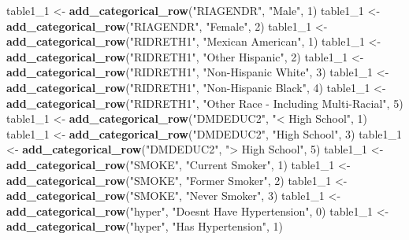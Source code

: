 \documentclass[
]{article}
\newenvironment{Shaded}{\begin{snugshade}}{\end{snugshade}}
\newcommand{\DecValTok}[1]{\textcolor[rgb]{0.00,0.00,0.81}{#1}}
\newcommand{\FunctionTok}[1]{\textcolor[rgb]{0.13,0.29,0.53}{\textbf{#1}}}
\newcommand{\NormalTok}[1]{#1}
\newcommand{\OtherTok}[1]{\textcolor[rgb]{0.56,0.35,0.01}{#1}}
\newcommand{\StringTok}[1]{\textcolor[rgb]{0.31,0.60,0.02}{#1}}
\begin{document}
\begin{Shaded}
\begin{Highlighting}[]
\NormalTok{table1\_1 }\OtherTok{\textless{}{-}} \FunctionTok{add\_categorical\_row}\NormalTok{(}\StringTok{"RIAGENDR"}\NormalTok{, }\StringTok{"Male"}\NormalTok{, }\DecValTok{1}\NormalTok{)}
\NormalTok{table1\_1 }\OtherTok{\textless{}{-}} \FunctionTok{add\_categorical\_row}\NormalTok{(}\StringTok{"RIAGENDR"}\NormalTok{, }\StringTok{"Female"}\NormalTok{, }\DecValTok{2}\NormalTok{)}
\NormalTok{table1\_1 }\OtherTok{\textless{}{-}} \FunctionTok{add\_categorical\_row}\NormalTok{(}\StringTok{"RIDRETH1"}\NormalTok{, }\StringTok{"Mexican American"}\NormalTok{, }\DecValTok{1}\NormalTok{)}
\NormalTok{table1\_1 }\OtherTok{\textless{}{-}} \FunctionTok{add\_categorical\_row}\NormalTok{(}\StringTok{"RIDRETH1"}\NormalTok{, }\StringTok{"Other Hispanic"}\NormalTok{, }\DecValTok{2}\NormalTok{)}
\NormalTok{table1\_1 }\OtherTok{\textless{}{-}} \FunctionTok{add\_categorical\_row}\NormalTok{(}\StringTok{"RIDRETH1"}\NormalTok{, }\StringTok{"Non{-}Hispanic White"}\NormalTok{, }\DecValTok{3}\NormalTok{)}
\NormalTok{table1\_1 }\OtherTok{\textless{}{-}} \FunctionTok{add\_categorical\_row}\NormalTok{(}\StringTok{"RIDRETH1"}\NormalTok{, }\StringTok{"Non{-}Hispanic Black"}\NormalTok{, }\DecValTok{4}\NormalTok{)}
\NormalTok{table1\_1 }\OtherTok{\textless{}{-}} \FunctionTok{add\_categorical\_row}\NormalTok{(}\StringTok{"RIDRETH1"}\NormalTok{, }\StringTok{"Other Race {-} Including Multi{-}Racial"}\NormalTok{, }\DecValTok{5}\NormalTok{)}
\NormalTok{table1\_1 }\OtherTok{\textless{}{-}} \FunctionTok{add\_categorical\_row}\NormalTok{(}\StringTok{"DMDEDUC2"}\NormalTok{, }\StringTok{"\textless{} High School"}\NormalTok{, }\DecValTok{1}\NormalTok{)}
\NormalTok{table1\_1 }\OtherTok{\textless{}{-}} \FunctionTok{add\_categorical\_row}\NormalTok{(}\StringTok{"DMDEDUC2"}\NormalTok{, }\StringTok{"High School"}\NormalTok{, }\DecValTok{3}\NormalTok{)}
\NormalTok{table1\_1 }\OtherTok{\textless{}{-}} \FunctionTok{add\_categorical\_row}\NormalTok{(}\StringTok{"DMDEDUC2"}\NormalTok{, }\StringTok{"\textgreater{} High School"}\NormalTok{, }\DecValTok{5}\NormalTok{)}
\NormalTok{table1\_1 }\OtherTok{\textless{}{-}} \FunctionTok{add\_categorical\_row}\NormalTok{(}\StringTok{"SMOKE"}\NormalTok{, }\StringTok{"Current Smoker"}\NormalTok{, }\DecValTok{1}\NormalTok{)}
\NormalTok{table1\_1 }\OtherTok{\textless{}{-}} \FunctionTok{add\_categorical\_row}\NormalTok{(}\StringTok{"SMOKE"}\NormalTok{, }\StringTok{"Former Smoker"}\NormalTok{, }\DecValTok{2}\NormalTok{)}
\NormalTok{table1\_1 }\OtherTok{\textless{}{-}} \FunctionTok{add\_categorical\_row}\NormalTok{(}\StringTok{"SMOKE"}\NormalTok{, }\StringTok{"Never Smoker"}\NormalTok{, }\DecValTok{3}\NormalTok{)}
\NormalTok{table1\_1 }\OtherTok{\textless{}{-}} \FunctionTok{add\_categorical\_row}\NormalTok{(}\StringTok{"hyper"}\NormalTok{, }\StringTok{"Doesn\textquotesingle{}t Have Hypertension"}\NormalTok{, }\DecValTok{0}\NormalTok{)}
\NormalTok{table1\_1 }\OtherTok{\textless{}{-}} \FunctionTok{add\_categorical\_row}\NormalTok{(}\StringTok{"hyper"}\NormalTok{, }\StringTok{"Has Hypertension"}\NormalTok{, }\DecValTok{1}\NormalTok{)}


\end{Highlighting}
\end{Shaded}
\end{document}
